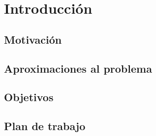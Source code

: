 \chapter{Introducción}
\label{cap:introduccion}
\begin{resumen}
	
\end{resumen}

\section{Motivación}

\section{Aproximaciones al problema}

\section{Objetivos}

\section{Plan de trabajo}

